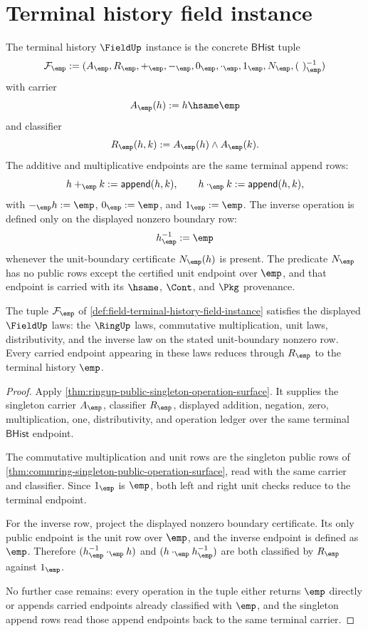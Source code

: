 \section{Terminal history field instance}
\label{sec:field-terminal-history-instance}

\begin{definition}
\label{def:field-terminal-history-field-instance}
The terminal history $\FieldUp$ instance is the concrete $\mathsf{BHist}$
tuple
$$
\mathcal F_{\emp}:=
(A_{\emp},R_{\emp},+_{\emp},-_{\emp},0_{\emp},\cdot_{\emp},1_{\emp},
N_{\emp},(\ )^{-1}_{\emp})
$$
with carrier
$$
A_{\emp}(h):= h\hsame\emp
$$
and classifier
$$
R_{\emp}(h,k):=A_{\emp}(h)\land A_{\emp}(k).
$$
The additive and multiplicative endpoints are the same terminal append rows:
$$
h+_{\emp}k:=\mathsf{append}(h,k),\qquad
h\cdot_{\emp}k:=\mathsf{append}(h,k),
$$
with $-_{\emp}h:=\emp$, $0_{\emp}:=\emp$, and $1_{\emp}:=\emp$. The inverse
operation is defined only on the displayed nonzero boundary row:
$$
h^{-1}_{\emp}:=\emp
$$
whenever the unit-boundary certificate $N_{\emp}(h)$ is present. The predicate
$N_{\emp}$ has no public rows except the certified unit endpoint over
$\emp$, and that endpoint is carried with its $\hsame$, $\Cont$, and $\Pkg$
provenance.
\end{definition}

\begin{theorem}
\label{thm:field-terminal-history-field-laws}
The tuple $\mathcal F_{\emp}$ of
\autoref{def:field-terminal-history-field-instance} satisfies the displayed
$\FieldUp$ laws: the $\RingUp$ laws, commutative multiplication, unit laws,
distributivity, and the inverse law on the stated unit-boundary nonzero row.
Every carried endpoint appearing in these laws reduces through $R_{\emp}$ to
the terminal history $\emp$.
\end{theorem}
\begin{proof}
Apply \autoref{thm:ringup-public-singleton-operation-surface}. It supplies the
singleton carrier $A_{\emp}$, classifier $R_{\emp}$, displayed addition,
negation, zero, multiplication, one, distributivity, and operation ledger over
the same terminal $\mathsf{BHist}$ endpoint.

The commutative multiplication and unit rows are the singleton public rows of
\autoref{thm:commring-singleton-public-operation-surface}, read with the same
carrier and classifier. Since $1_{\emp}$ is $\emp$, both left and right unit
checks reduce to the terminal endpoint.

For the inverse row, project the displayed nonzero boundary certificate. Its
only public endpoint is the unit row over $\emp$, and the inverse endpoint is
defined as $\emp$. Therefore
$(h^{-1}_{\emp}\cdot_{\emp} h)$ and $(h\cdot_{\emp} h^{-1}_{\emp})$ are both
classified by $R_{\emp}$ against $1_{\emp}$.

No further case remains: every operation in the tuple either returns
$\emp$ directly or appends carried endpoints already classified with $\emp$,
and the singleton append rows read those append endpoints back to the same
terminal carrier.
\end{proof}

